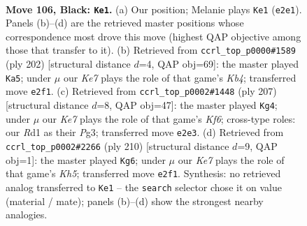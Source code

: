 \documentclass[11pt]{article}
\begin{document}
\clearpage

\begin{figure}[p]\centering
\begin{subfigure}{0.46\textwidth}\centering
\resizebox{\linewidth}{!}{%
\newchessgame
\chessboard[
  setfen={8/8/8/8/8/7K/1R2kp2/3r4 b - - 27 106},
  showmover=false,
  pgfstyle=straightmove, color=movearrow, markmove={e2-e1}
]}
\caption{}
\end{subfigure}\hfill
\begin{subfigure}{0.46\textwidth}\centering
\resizebox{\linewidth}{!}{%
\newchessgame
\chessboard[
  setfen={3k4/8/8/8/PKR5/8/8/1r6 w - - 3 102},
  showmover=false,
  pgfstyle=straightmove, color=movearrow, markmove={b4-a5}
]}
\caption{}
\end{subfigure}
\\[4pt]
\begin{subfigure}{0.46\textwidth}\centering
\resizebox{\linewidth}{!}{%
\newchessgame
\chessboard[
  setfen={8/6n1/6p1/8/8/5kp1/3K4/5R2 b - - 11 104},
  showmover=false,
  pgfstyle=straightmove, color=movearrow, markmove={f3-g4}
]}
\caption{}
\end{subfigure}\hfill
\begin{subfigure}{0.46\textwidth}\centering
\resizebox{\linewidth}{!}{%
\newchessgame
\chessboard[
  setfen={7k/r7/3R4/6PK/8/6P1/8/8 w - - 7 106},
  showmover=false,
  pgfstyle=straightmove, color=movearrow, markmove={h5-g6}
]}
\caption{}
\end{subfigure}
\caption{\textbf{Move 106, Black: \texttt{Ke1}.} (a) Our position; Melanie plays \texttt{Ke1} (\texttt{e2e1}). Panels (b)--(d) are the retrieved master positions whose correspondence most drove this move (highest QAP objective among those that transfer to it). (b) Retrieved from \texttt{ccrl\_top\_p0000\#1589} (ply 202) [structural distance $d$=4, QAP obj=69]: the master played \texttt{Ka5}; under $\mu$ our \emph{Ke7} plays the role of that game's \emph{Kb4}; transferred move \texttt{e2f1}. (c) Retrieved from \texttt{ccrl\_top\_p0002\#1448} (ply 207) [structural distance $d$=8, QAP obj=47]: the master played \texttt{Kg4}; under $\mu$ our \emph{Ke7} plays the role of that game's \emph{Kf6}; cross-type roles: our \emph{R}d1 as their \emph{P}g3; transferred move \texttt{e2e3}. (d) Retrieved from \texttt{ccrl\_top\_p0002\#2266} (ply 210) [structural distance $d$=9, QAP obj=1]: the master played \texttt{Kg6}; under $\mu$ our \emph{Ke7} plays the role of that game's \emph{Kh5}; transferred move \texttt{e2f1}. Synthesis: no retrieved analog transferred to \texttt{Ke1} -- the \texttt{search} selector chose it on value (material / mate); panels (b)--(d) show the strongest nearby analogies.}
\label{fig:thought-m211}
\end{figure}
\end{document}
